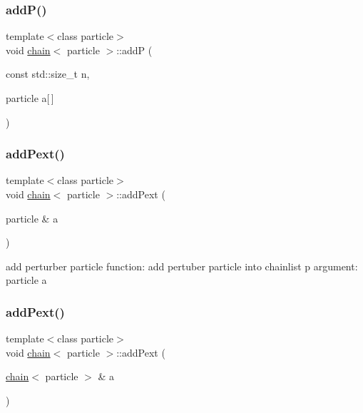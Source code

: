 \hypertarget{classchain_aa8991445a46067f7196fad6fd1d975c4}{}\label{classchain_aa8991445a46067f7196fad6fd1d975c4} 
\subsubsection{\texorpdfstring{add\+P()}{addP()}\hspace{0.1cm}{\footnotesize\ttfamily [3/3]}}
{\footnotesize\ttfamily template$<$class particle$>$ \\
void \hyperlink{classchain}{chain}$<$ particle $>$\+::addP (\begin{DoxyParamCaption}\item[{const std\+::size\+\_\+t}]{n,  }\item[{particle}]{a\mbox{[}$\,$\mbox{]} }\end{DoxyParamCaption})\hspace{0.3cm}{\ttfamily [inline]}}

\hypertarget{classchain_ae41d460ef51d06c4474285f866caea02}{}\label{classchain_ae41d460ef51d06c4474285f866caea02} 
\subsubsection{\texorpdfstring{add\+Pext()}{addPext()}\hspace{0.1cm}{\footnotesize\ttfamily [1/3]}}
{\footnotesize\ttfamily template$<$class particle$>$ \\
void \hyperlink{classchain}{chain}$<$ particle $>$\+::add\+Pext (\begin{DoxyParamCaption}\item[{particle \&}]{a }\end{DoxyParamCaption})\hspace{0.3cm}{\ttfamily [inline]}}



add perturber particle function\+: add pertuber particle into chainlist p argument\+: particle a 

\hypertarget{classchain_a2e2533d167715198a0316ce037dbd34f}{}\label{classchain_a2e2533d167715198a0316ce037dbd34f} 
\subsubsection{\texorpdfstring{add\+Pext()}{addPext()}\hspace{0.1cm}{\footnotesize\ttfamily [2/3]}}
{\footnotesize\ttfamily template$<$class particle$>$ \\
void \hyperlink{classchain}{chain}$<$ particle $>$\+::add\+Pext (\begin{DoxyParamCaption}\item[{\hyperlink{classchain}{chain}$<$ particle $>$ \&}]{a }\end{DoxyParamCaption})\hspace{0.3cm}{\ttfamily [inline]}}

